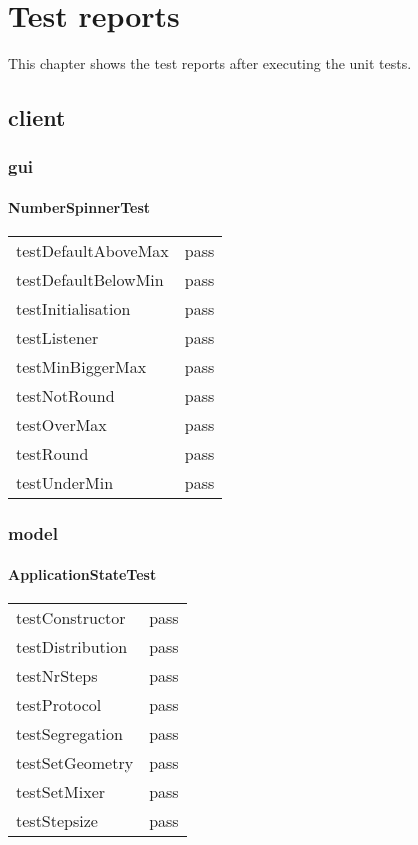 \chapter{Test reports}\label{chap:testReports}

This chapter shows the test reports after executing the unit tests.

\section{client}
\subsection{gui}
\subsubsection*{NumberSpinnerTest}
\begin{tabular}{l|l}
testDefaultAboveMax  & pass \\
testDefaultBelowMin    & pass \\
testInitialisation           & pass \\
testListener                 & pass \\
testMinBiggerMax        & pass \\
testNotRound               & pass \\
testOverMax                & pass \\
testRound                    & pass \\
testUnderMin               & pass \\
\end{tabular}

\subsection{model}
\subsubsection*{ApplicationStateTest}
\begin{tabular}{l|l}
testConstructor   & pass \\
testDistribution    & pass \\
testNrSteps         & pass \\
testProtocol         & pass \\
testSegregation   & pass \\
testSetGeometry & pass \\
testSetMixer        & pass \\
testStepsize         & pass \\
\end{tabular}

